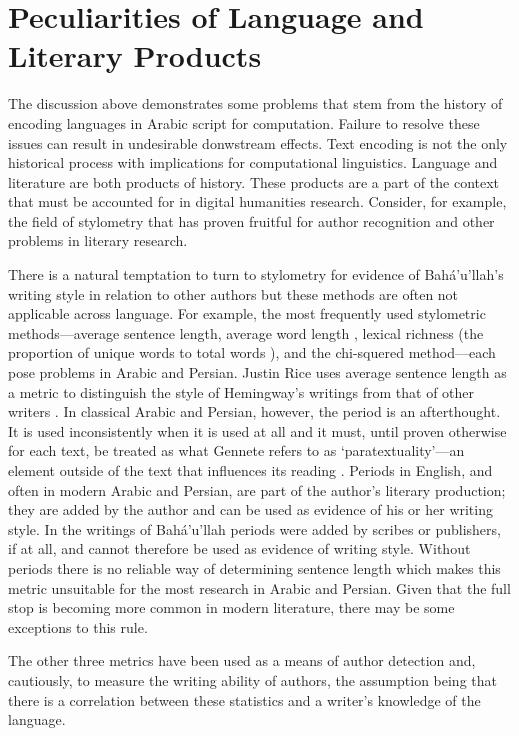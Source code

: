 \documentclass[12pt, oneside]{report}
\begin{document}
\section{Peculiarities of Language and Literary Products}
\par
The discussion above demonstrates some problems that stem from the history of encoding languages in Arabic script for computation. Failure to resolve these issues can result in undesirable donwstream effects. Text encoding is not the only historical process with implications for computational linguistics. Language and literature are both products of history. These products are a part of the context that must be accounted for in digital humanities research. Consider, for example, the field of stylometry that has proven fruitful for author recognition and other problems in literary research.
\par
There is a natural temptation to turn to stylometry for evidence of Bah\'{a}'u'llah's writing style in relation to other authors but these methods are often not applicable across language.
For example, the most frequently used stylometric methods---average sentence length, average word length \cite{justin_rice_what_2018}, lexical richness (the proportion of unique words to total words \cite{justin_rice_what_2018}), and the chi-squered method---each pose problems in Arabic and Persian.
Justin Rice uses average sentence length as a metric to distinguish the style of Hemingway's writings from that of other writers \cite{justin_rice_what_2018}.
In classical Arabic and Persian, however, the period is an afterthought.
It is used inconsistently when it is used at all and it must, until proven otherwise for each text, be treated as what Gennete refers to as `paratextuality'–--an element outside of the text that influences its reading \cite{genette_gerard_palimpsests:_1997}.
Periods in English, and often in modern Arabic and Persian, are part of the author's literary production; they are added by the author and can be used as evidence of his or her writing style.
In the writings of Bah\'{a}'u'llah periods were added by scribes or publishers, if at all, and cannot therefore be used as evidence of writing style.
Without periods there is no reliable way of determining sentence length which makes this metric unsuitable for the most research in Arabic and Persian.
Given that the full stop is becoming more common in modern literature, there may be some exceptions to this rule.
\par
The other three metrics have been used as a means of author detection and, cautiously, to measure the writing ability of authors, the assumption being that there is a correlation between these statistics and a writer's knowledge of the language.
\end{document}
